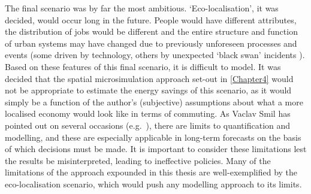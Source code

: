 \begin{table}[htbp]
\caption[Differences between commuters affected by the `Dutch' and `Finnish' scenarios]
{Differences between commuters affected by the `Dutch' and `Finnish' scenarios, expressed
as averages over all commuters in South Yorkshire}
\label{tdifscens}
\end{table}

The final scenario was by far the most ambitious. `Eco-localisation', it was
decided, would occur long in the future. People would have different
attributes, the distribution of jobs would be different and the
entire structure and function of urban systems may have changed
due to previously unforeseen processes and events (some driven by technology,
others by unexpected `black swan' incidents \citep{Korowicz2011}). Based
on these features of this final scenario, it is difficult to model. It was
decided that the spatial microsimulation approach set-out in \cref{Chapter4}
would not be appropriate to estimate the energy savings of this scenario, as
it would simply be a function of the author's (subjective) assumptions about
what a more localised economy would look like in terms of commuting.
As Vaclav Smil has pointed out on several occasions (e.g.~\citeyear{Smil1993, Smil2010}),
there are limits to quantification and modelling, and these are especially
applicable in long-term forecasts on the basis of which decisions must be made.
It is important to consider these limitations lest the results be misinterpreted,
leading to ineffective policies. Many of the limitations of the approach
expounded in this thesis are well-exemplified by the eco-localisation
scenario, which would push any modelling approach to its limits.

